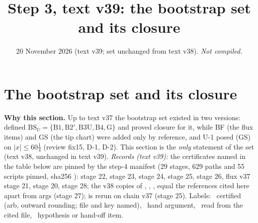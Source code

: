 \documentclass[11pt]{article}
\title{Step 3, text v39: the bootstrap set and its closure}
\author{}\date{20 November 2026 (text v39; set unchanged from text v38). \emph{Not compiled.}}
\begin{document}
\maketitle
\fi

\section{The bootstrap set and its closure}\label{BS:sec}
\noindent\textbf{Why this section.} Up to text v37 the bootstrap set existed in two versions:  defined $\mathrm{BS}_U=\{\mathrm{B1},\mathrm{B2}',\mathrm{B3U},\mathrm{B4},\mathrm{G}\}$ and proved closure for it, while BF (the flux items) and GS (the tip chart) were added only by reference, and U-1 posed (GS) on $|x|\le60\frac14$ (review fix15, D-1, D-2). This section is the \emph{only} statement of the set (text v38, unchanged in text v39). \emph{Records (text v39):} the certificates named in the table below are pinned by the step-4 manifest  (29 stages, 629 paths and 55 scripts pinned, sha256 ):  stage 22,  stage 23,  stage 24,  stage 25,  stage 26, flux v37 stage 21,  stage 20,  stage 28; the v38 copies of , , ,  equal the references cited here apart from args (stage 27);  is rerun on chain v37 (stage 25). Labels: \tC\ certified (arb, outward rounding; file and key named), \tHd\ hand argument, \tR\ read from the cited file, \tH\ hypothesis or hand-off item.
\end{document}
